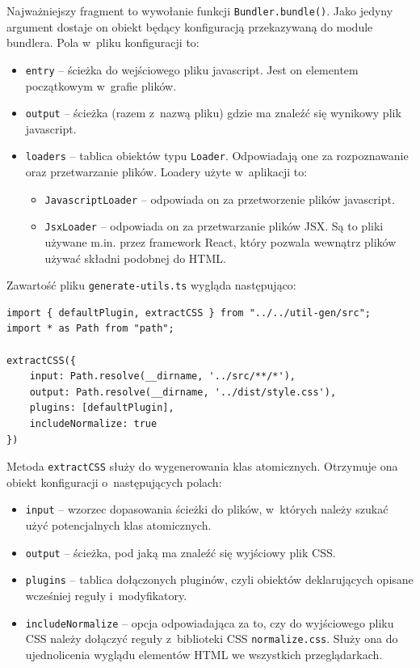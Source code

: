 \documentclass{SGGW-thesis}
\begin{document}
Najważniejszy fragment to wywołanie funkcji \verb|Bundler.bundle()|. Jako jedyny argument dostaje on obiekt będący konfiguracją przekazywaną do module bundlera. Pola w~pliku konfiguracji to:
\begin{itemize}
    \item \verb|entry| -- ścieżka do wejściowego pliku javascript. Jest on elementem początkowym w~grafie plików.
    \item \verb|output| -- ścieżka (razem z~nazwą pliku) gdzie ma znaleźć się wynikowy plik javascript.
    \item \verb|loaders| -- tablica obiektów typu \verb|Loader|. Odpowiadają one za rozpoznawanie oraz przetwarzanie plików. Loadery użyte w~aplikacji to:
    \begin{itemize}
        \item \verb|JavascriptLoader| -- odpowiada on za przetworzenie plików javascript.
        \item \verb|JsxLoader| -- odpowiada on za przetwarzanie plików JSX. Są to pliki używane m.in. przez framework React, który pozwala wewnątrz plików używać składni podobnej do HTML.
    \end{itemize}
\end{itemize}

Zawartość pliku \verb|generate-utils.ts| wygląda następująco:
\begin{verbatim}
import { defaultPlugin, extractCSS } from "../../util-gen/src";
import * as Path from "path";

extractCSS({
	input: Path.resolve(__dirname, '../src/**/*'),
	output: Path.resolve(__dirname, '../dist/style.css'),
	plugins: [defaultPlugin],
	includeNormalize: true
})
\end{verbatim}

Metoda \verb|extractCSS| służy do wygenerowania klas atomicznych. Otrzymuje ona obiekt konfiguracji o~następujących polach:
\begin{itemize}
    \item \verb|input| -- wzorzec dopasowania ścieżki do plików, w~których należy szukać użyć potencjalnych klas atomicznych.
    \item \verb|output| -- ścieżka, pod jaką ma znaleźć się wyjściowy plik CSS.
    \item \verb|plugins| -- tablica dołączonych pluginów, czyli obiektów deklarujących opisane wcześniej reguły i~modyfikatory.
    \item \verb|includeNormalize| -- opcja odpowiadająca za to, czy do wyjściowego pliku CSS należy dołączyć reguły z~biblioteki CSS \verb|normalize.css|. Służy ona do ujednolicenia wyglądu elementów HTML we wszystkich przeglądarkach.
\end{itemize}
\end{document}

